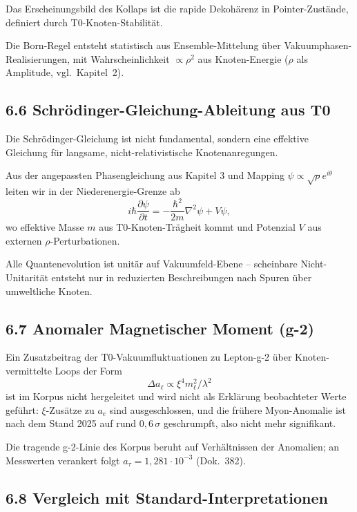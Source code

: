 	Das Erscheinungsbild des Kollaps ist die rapide Dekohärenz in Pointer-Zustände, definiert durch T0-Knoten-Stabilität.
	
	Die Born-Regel entsteht statistisch aus Ensemble-Mittelung über Vakuumphasen-Realisierungen, mit Wahrscheinlichkeit $\propto \rho^2$ aus Knoten-Energie ($\rho$ als Amplitude, vgl.\ Kapitel~2).
	
	\subsection{6.6 Schrödinger-Gleichung-Ableitung aus T0}
	
	Die Schrödinger-Gleichung ist nicht fundamental, sondern eine effektive Gleichung für langsame, nicht-relativistische Knotenanregungen.
	
	Aus der angepassten Phasengleichung aus Kapitel 3 und Mapping $\psi \propto \sqrt{\rho} e^{i\theta}$ leiten wir in der Niederenergie-Grenze ab
	\[
	i \hbar \frac{\partial \psi}{\partial t} = -\frac{\hbar^2}{2m} \nabla^2 \psi + V \psi,
	\]
	wo effektive Masse $m$ aus T0-Knoten-Trägheit kommt und Potenzial $V$ aus externen $\rho$-Perturbationen.
	
	Alle Quantenevolution ist unitär auf Vakuumfeld-Ebene – scheinbare Nicht-Unitarität entsteht nur in reduzierten Beschreibungen nach Spuren über umweltliche Knoten.
	
	\subsection{6.7 Anomaler Magnetischer Moment (g-2)}
	
	Ein Zusatzbeitrag der T0-Vakuumfluktuationen zu Lepton-g-2 über Knoten-vermittelte Loops der Form
	\[
	\Delta a_\ell \propto \xi^4 m_\ell^2 / \lambda^2
	\]
	ist im Korpus nicht hergeleitet und wird nicht als Erklärung beobachteter Werte geführt: $\xi$-Zusätze zu $a_e$ sind ausgeschlossen, und die frühere Myon-Anomalie ist nach dem Stand 2025 auf rund $0{,}6\,\sigma$ geschrumpft, also nicht mehr signifikant.
	
	Die tragende g-2-Linie des Korpus beruht auf Verhältnissen der Anomalien; an Messwerten verankert folgt $a_\tau = 1{,}281 \cdot 10^{-3}$ (Dok.~382).
	
	\subsection{6.8 Vergleich mit Standard-Interpretationen}
	
